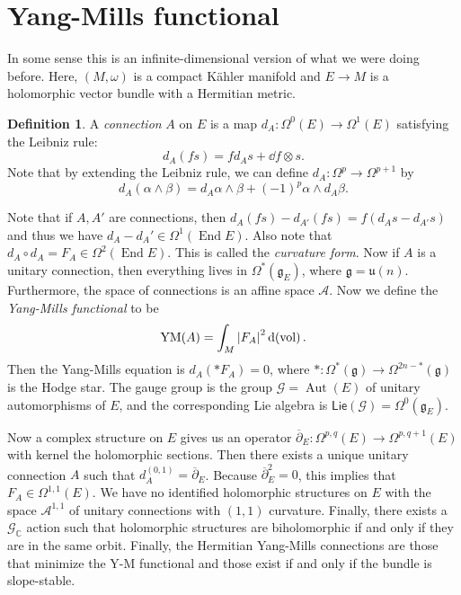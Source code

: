 \documentclass[leqno, openany]{memoir}
\theoremstyle{definition}
\newtheorem{defn}[thm]{Definition}
\theoremstyle{remark}
\theoremstyle{plain}
\theoremstyle{definition}
\theoremstyle{remark}
\newcommand{\C}{\mathbb{C}}
\newcommand{\mc}[1]{\mathcal{#1}}
\newcommand{\mf}[1]{\mathfrak{#1}}
\newcommand{\mr}[1]{\mathrm{#1}}
\newcommand{\ms}[1]{\mathsf{#1}}
\newcommand{\ol}[1]{\overline{#1}}
\DeclareMathOperator{\End}{End}
\DeclareMathOperator{\Aut}{Aut}
\begin{document}
\section{Yang-Mills functional}%

In some sense this is an infinite-dimensional version of what we were doing
before. Here, $(M, \omega)$ is a compact K\"ahler manifold and $E \to M$ is a
holomorphic vector bundle with a Hermitian metric.

\begin{defn} A \textit{connection} $A$ on $E$ is a map $d_A \colon \Omega^0(E)
    \to \Omega^1(E)$ satisfying the Leibniz rule: \[ d_A(f s) = f d_A s +
    \dd{f} \otimes s. \] Note that by extending the Leibniz rule, we can define
    $d_A \colon \Omega^p \to \Omega^{p+1}$ by \[ d_A(\alpha \wedge \beta) = d_A
    \alpha \wedge \beta + (-1)^p \alpha \wedge d_A \beta. \] \end{defn}

Note that if $A, A'$ are connections, then $d_A(fs) - d_{A'}(fs) = f(d_A s -
d_{A'} s)$ and thus we have $d_A - d_A' \in \Omega^1(\End E)$. Also note that
$d_A \circ d_A = F_A \in \Omega^2(\End E)$. This is called the
\textit{curvature form}. Now if $A$ is a unitary connection, then everything
lives in $\Omega^*(\mf{g}_E)$, where $\mf{g} = \mf{u}(n)$. Furthermore, the
space of connections is an affine space $\mc{A}$. Now we define the
\textit{Yang-Mills functional} to be \[ \mr{YM}(A) = \int_M \abs{F_A}^2
\dd{\mr{(vol)}}. \] Then the Yang-Mills equation is $d_A(* F_A) = 0$, where $*
\colon \Omega^*(\mf{g}) \to \Omega^{2n-*}(\mf{g})$ is the Hodge star. The gauge
group is the group $\mc{G} = \Aut(E)$ of unitary automorphisms of $E$, and the
corresponding Lie algebra is $\ms{Lie}(\mc{G}) = \Omega^0(\mf{g}_E)$.

Now a complex structure on $E$ gives us an operator $\ol{\partial}_E \colon
\Omega^{p,q}(E) \to \Omega^{p,q+1}(E)$ with kernel the holomorphic sections.
Then there exists a unique unitary connection $A$ such that $d_A^{(0,1)} =
\ol{\partial}_E$. Because $\ol{\partial}_E^2 = 0$, this implies that $F_A \in
\Omega^{1,1}(E)$. We have no identified holomorphic structures on $E$ with the
space $\mc{A}^{1,1}$ of unitary connections with $(1,1)$ curvature. Finally,
there exists a $\mc{G}_{\C}$ action such that holomorphic structures are
biholomorphic if and only if they are in the same orbit. Finally, the Hermitian
Yang-Mills connections are those that minimize the Y-M functional and those
exist if and only if the bundle is slope-stable.
\end{document}
